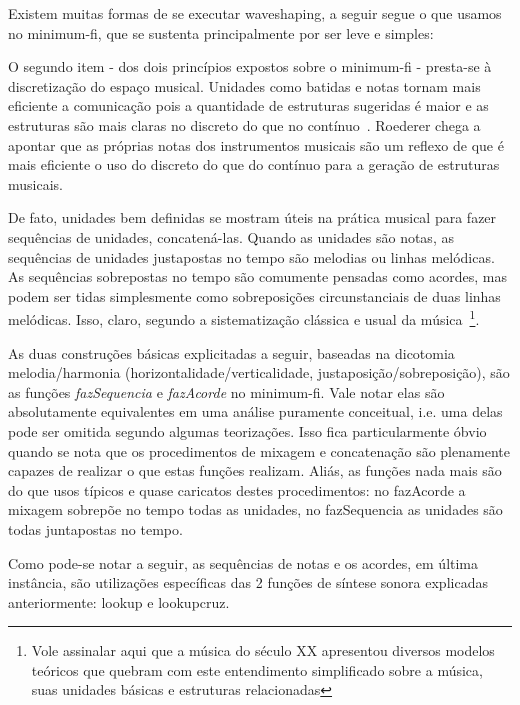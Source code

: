 Existem muitas formas de se executar waveshaping, a seguir segue o que usamos no minimum-fi, que se sustenta principalmente por ser leve e simples:


O segundo item - dos dois princípios expostos sobre o minimum-fi - presta-se à discretização do espaço musical. Unidades como batidas e notas
tornam mais eficiente a comunicação pois a quantidade
de estruturas sugeridas é maior e as estruturas são mais claras no discreto do que no contínuo~\cite{Roederer}. Roederer chega a
apontar que as próprias notas dos instrumentos musicais são um reflexo de que é mais eficiente
o uso do discreto do que do contínuo para a geração de estruturas musicais.

De fato, unidades bem definidas se mostram úteis na prática musical 
para fazer sequências de unidades, concatená-las. Quando as unidades
são notas, as sequências de unidades justapostas no tempo são melodias ou linhas melódicas. As
sequências sobrepostas no tempo são comumente pensadas como acordes, mas podem ser tidas simplesmente
como sobreposições circunstanciais de duas linhas melódicas. Isso, claro, segundo
a sistematização clássica e usual da música~\cite{Lacerda}\footnote{Vole assinalar aqui que a música do século XX apresentou diversos modelos teóricos que quebram com este entendimento simplificado sobre a música, suas unidades básicas e estruturas relacionadas}.

As duas construções básicas explicitadas a seguir, baseadas na dicotomia melodia/harmonia
(horizontalidade/verticalidade, justaposição/sobreposição), são
as funções \emph{fazSequencia} e \emph{fazAcorde} no minimum-fi. Vale notar elas são absolutamente 
equivalentes em uma análise puramente conceitual, i.e. uma delas pode ser omitida segundo algumas teorizações. Isso fica particularmente óbvio quando se nota que os procedimentos de mixagem e concatenação são
plenamente capazes de realizar o que estas funções realizam. Aliás, as funções nada
mais são do que usos típicos e quase caricatos destes procedimentos: no fazAcorde a mixagem
sobrepõe no tempo todas as unidades, no fazSequencia as unidades são todas juntapostas no tempo.

Como pode-se notar a seguir, as sequências de notas e os acordes, em última instância, são utilizações específicas das 2 funções de síntese sonora explicadas anteriormente: lookup e lookupcruz.


